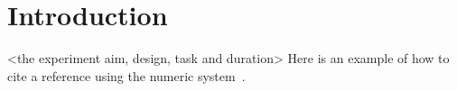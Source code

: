 \section{Introduction}

<the experiment aim, design, task and duration> 
Here is an example of how to cite a reference using the numeric system~\cite{parikh1980adaptive}.

